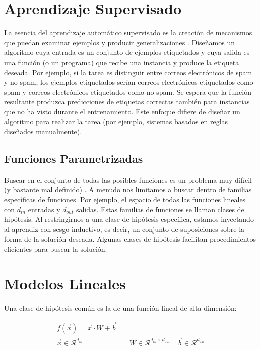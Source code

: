 

\section{Aprendizaje Supervisado}

La esencia del aprendizaje automático supervisado es la creación de mecanismos que puedan examinar ejemplos y producir generalizaciones \cite{goldberg2017neural}. Diseñamos un algoritmo cuya entrada es un conjunto de ejemplos etiquetados y cuya salida es una función (o un programa) que recibe una instancia y produce la etiqueta deseada. Por ejemplo, si la tarea es distinguir entre correos electrónicos de spam y no spam, los ejemplos etiquetados serían correos electrónicos etiquetados como spam y correos electrónicos etiquetados como no spam. Se espera que la función resultante produzca predicciones de etiquetas correctas también para instancias que no ha visto durante el entrenamiento. Este enfoque difiere de diseñar un algoritmo para realizar la tarea (por ejemplo, sistemas basados en reglas diseñados manualmente).

\subsection{Funciones Parametrizadas}

Buscar en el conjunto de todas las posibles funciones es un problema muy difícil (y bastante mal definido) \cite{goldberg2017neural}. A menudo nos limitamos a buscar dentro de familias específicas de funciones. Por ejemplo, el espacio de todas las funciones lineales con $d_{in}$ entradas y $d_{out}$ salidas. Estas familias de funciones se llaman clases de hipótesis. Al restringirnos a una clase de hipótesis específica, estamos inyectando al aprendiz con sesgo inductivo, es decir, un conjunto de suposiciones sobre la forma de la solución deseada. Algunas clases de hipótesis facilitan procedimientos eficientes para buscar la solución.

\section{Modelos Lineales}

Una clase de hipótesis común es la de una función lineal de alta dimensión:

\begin{equation}
\begin{split}
f(\vec{x}) = \vec{x} \cdot W + \vec{b}\\
\vec{x} \in  \mathcal{R}^{d_{in}} & \quad W \in  \mathcal{R}^{d_{in}\times d_{out}} \quad \vec{b} \in  \mathcal{R}^{d_{out}}
\end{split}
\end{equation}

